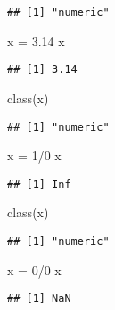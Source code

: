 \documentclass[
]{book}
\newenvironment{Shaded}{\begin{snugshade}}{\end{snugshade}}
\newcommand{\DecValTok}[1]{\textcolor[rgb]{0.00,0.00,0.81}{#1}}
\newcommand{\FloatTok}[1]{\textcolor[rgb]{0.00,0.00,0.81}{#1}}
\newcommand{\FunctionTok}[1]{\textcolor[rgb]{0.00,0.00,0.00}{#1}}
\newcommand{\NormalTok}[1]{#1}
\newcommand{\OtherTok}[1]{\textcolor[rgb]{0.56,0.35,0.01}{#1}}
\newcommand{\SpecialCharTok}[1]{\textcolor[rgb]{0.00,0.00,0.00}{#1}}
\begin{document}
\begin{verbatim}
## [1] "numeric"
\end{verbatim}

\begin{Shaded}
\begin{Highlighting}[]
\NormalTok{x }\OtherTok{=} \FloatTok{3.14}
\NormalTok{x}
\end{Highlighting}
\end{Shaded}

\begin{verbatim}
## [1] 3.14
\end{verbatim}

\begin{Shaded}
\begin{Highlighting}[]
\FunctionTok{class}\NormalTok{(x)}
\end{Highlighting}
\end{Shaded}

\begin{verbatim}
## [1] "numeric"
\end{verbatim}

\begin{Shaded}
\begin{Highlighting}[]
\NormalTok{x }\OtherTok{=} \DecValTok{1}\SpecialCharTok{/}\DecValTok{0}
\NormalTok{x}
\end{Highlighting}
\end{Shaded}

\begin{verbatim}
## [1] Inf
\end{verbatim}

\begin{Shaded}
\begin{Highlighting}[]
\FunctionTok{class}\NormalTok{(x)}
\end{Highlighting}
\end{Shaded}

\begin{verbatim}
## [1] "numeric"
\end{verbatim}

\begin{Shaded}
\begin{Highlighting}[]
\NormalTok{x }\OtherTok{=} \DecValTok{0}\SpecialCharTok{/}\DecValTok{0}
\NormalTok{x}
\end{Highlighting}
\end{Shaded}

\begin{verbatim}
## [1] NaN
\end{verbatim}
\end{document}
